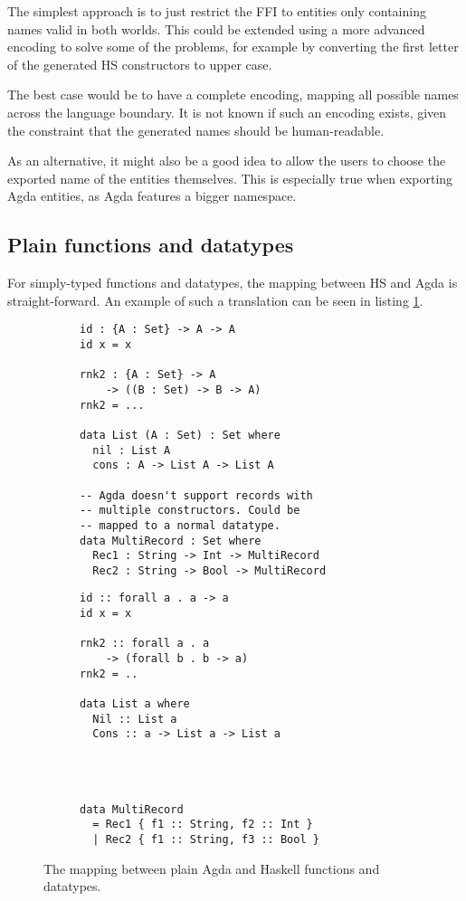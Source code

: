 \documentclass[12pt, a4paper, twoside]{report}
\begin{document}
The simplest approach is to just restrict the FFI to entities only containing names valid in both worlds.
This could be extended using a more advanced encoding to solve some of the problems, for example
by converting the first letter of the generated HS constructors to upper case.

The best case would be to have a complete encoding, mapping all possible names across the language boundary. It is not known
if such an encoding exists, given the constraint that the generated names should be human-readable.

As an alternative, it might also be a good idea to allow the users to choose the exported name of the entities themselves.
This is especially true when exporting Agda entities, as Agda features a bigger namespace.

\subsection{Plain functions and datatypes}
For simply-typed functions and datatypes, the mapping between HS and Agda is straight-forward. An example of such
a translation can be seen in listing \ref{lst:plain-agda-hs}.
\begin{figure}
\begin{subfigure}[b]{0.5\textwidth}
\begin{lstlisting}
id : {A : Set} -> A -> A
id x = x

rnk2 : {A : Set} -> A
    -> ((B : Set) -> B -> A)
rnk2 = ...

data List (A : Set) : Set where
  nil : List A
  cons : A -> List A -> List A

-- Agda doesn't support records with
-- multiple constructors. Could be
-- mapped to a normal datatype.
data MultiRecord : Set where
  Rec1 : String -> Int -> MultiRecord
  Rec2 : String -> Bool -> MultiRecord
\end{lstlisting}
\end{subfigure}
\hspace{10pt}
\begin{subfigure}[b]{0.5\textwidth}
\begin{lstlisting}
id :: forall a . a -> a
id x = x

rnk2 :: forall a . a
    -> (forall b . b -> a)
rnk2 = ..

data List a where
  Nil :: List a
  Cons :: a -> List a -> List a




data MultiRecord
  = Rec1 { f1 :: String, f2 :: Int }
  | Rec2 { f1 :: String, f3 :: Bool }
\end{lstlisting}
\end{subfigure}
\caption{The mapping between plain Agda and Haskell functions and datatypes.}
\label{lst:plain-agda-hs}
\end{figure}
\end{document}
